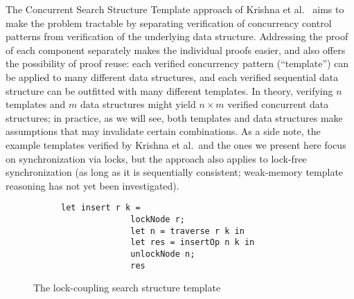 \documentclass[sigplan,10pt, screen]{acmart}
\begin{document}
The Concurrent Search Structure Template approach of Krishna et al.~\cite{templates} aims to make the problem tractable by separating verification of concurrency control patterns from verification of the underlying data structure. Addressing the proof of each component separately makes the individual proofs easier, and also offers the possibility of proof reuse: each verified concurrency pattern (``template'') can be applied to many different data structures, and each verified sequential data structure can be outfitted with many different templates. In theory, verifying $n$ templates and $m$ data structures might yield $n \times m$ verified concurrent data structures; in practice, as we will see, both templates and data structures make assumptions that may invalidate certain combinations. %
As a side note, the example templates verified by Krishna et al.~and the ones we present here focus on synchronization via locks, but the approach also applies to lock-free synchronization (as long as it is sequentially consistent; weak-memory template reasoning has not yet been investigated).


\begin{figure}[h]
	\begin{subfigure}[t]{0.45\textwidth}
		 
	\end{subfigure}\qquad
	\begin{subfigure}[t]{0.45\textwidth}
		\begin{lstlisting}[language=caml, style=myStyle]
			let insert r k =
			  lockNode r;
			  let n = traverse r k in
			  let res = insertOp n k in
			  unlockNode n; 
			  res\end{lstlisting}
	\end{subfigure}
	\caption{The lock-coupling search structure template}
	\label{template-ex}
\end{figure}


\begin{figure*}

\end{figure*}
\end{document}
